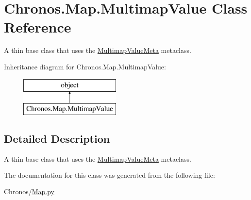 \hypertarget{classChronos_1_1Map_1_1MultimapValue}{}\section{Chronos.\+Map.\+Multimap\+Value Class Reference}
\label{classChronos_1_1Map_1_1MultimapValue}


A thin base class that uses the \hyperlink{classChronos_1_1Map_1_1MultimapValueMeta}{Multimap\+Value\+Meta} metaclass.  


Inheritance diagram for Chronos.\+Map.\+Multimap\+Value\+:\begin{figure}[H]
\begin{center}
\leavevmode
\includegraphics[height=2.000000cm]{classChronos_1_1Map_1_1MultimapValue}
\end{center}
\end{figure}


\subsection{Detailed Description}
A thin base class that uses the \hyperlink{classChronos_1_1Map_1_1MultimapValueMeta}{Multimap\+Value\+Meta} metaclass. 



The documentation for this class was generated from the following file\+:\begin{DoxyCompactItemize}
\item 
Chronos/\hyperlink{Map_8py}{Map.\+py}\end{DoxyCompactItemize}

